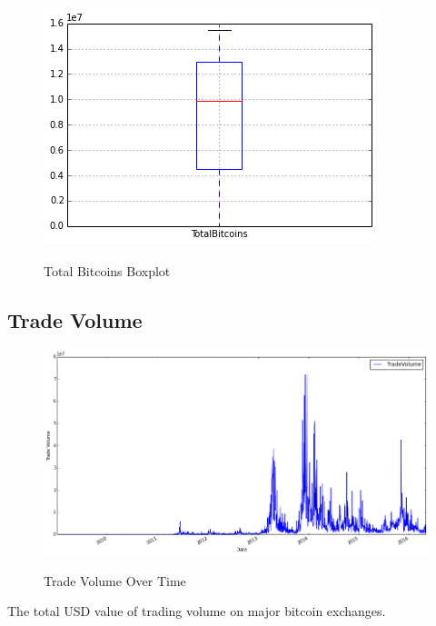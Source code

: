 \begin{figure}[bth]
  \myfloatalign
  {\includegraphics[width=1\linewidth]
    {gfx/total-bitcoins-boxplot}}
  \caption{Total Bitcoins
    Boxplot}
  \label{fig:total-bitcoins-boxplot}
\end{figure}

\clearpage

\subsection{Trade Volume}
\label{sec:trade-volume}

\begin{figure}[bth]
  \myfloatalign
  {\includegraphics[width=1\linewidth]
    {gfx/trade-volume-over-time}}
  \caption{Trade Volume
    Over Time}
  \label{fig:trade-volume-over-time}
\end{figure}

The total USD value of trading volume on major bitcoin exchanges.

